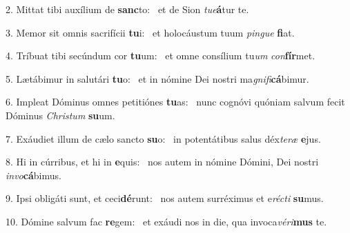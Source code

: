 2. Mittat tibi auxílium de \textbf{sanc}to: \ast\  et de Sion \textit{tu}\textit{e}\textbf{á}tur te.\

3. Memor sit omnis sacrifícii \textbf{tu}i: \ast\  et holocáustum tuum \textit{pin}\textit{gue} \textbf{fi}at.\

4. Tríbuat tibi secúndum cor \textbf{tu}um: \ast\  et omne consílium tu\textit{um} \textit{con}\textbf{fír}met.\

5. Lætábimur in salutári \textbf{tu}o: \ast\  et in nómine Dei nostri ma\textit{gni}\textit{fi}\textbf{cá}bimur.\

6. Impleat Dóminus omnes petitiónes \textbf{tu}as: \ast\  nunc cognóvi quóniam salvum fecit Dóminus \textit{Chris}\textit{tum} \textbf{su}um.\

7. Exáudiet illum de cælo sancto \textbf{su}o: \ast\  in potentátibus salus déx\textit{te}\textit{ræ} \textbf{e}jus.\

8. Hi in cúrribus, et hi in \textbf{e}quis: \ast\  nos autem in nómine Dómini, Dei nostri \textit{in}\textit{vo}\textbf{cá}bimus.\

9. Ipsi obligáti sunt, et ceci\textbf{dé}runt: \ast\  nos autem surréximus et e\textit{réc}\textit{ti} \textbf{su}mus.\

10. Dómine salvum fac \textbf{re}gem: \ast\  et exáudi nos in die, qua invoca\textit{vé}\textit{ri}\textbf{mus} te.\

